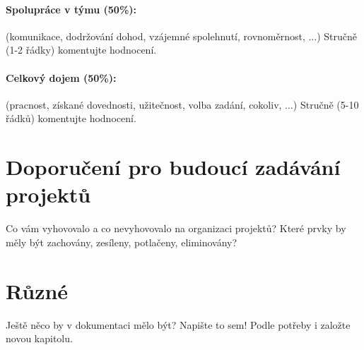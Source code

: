 \documentclass[11pt,a4paper]{article}
\begin{document}
\paragraph{Spolupráce v týmu (50\%):} (komunikace, dodržování dohod, vzájemné
spolehnutí, rovnoměrnost, $\ldots$)
Stručně (1-2 řádky) komentujte hodnocení.

\paragraph{Celkový dojem (50\%):} (pracnost, získané dovednosti, užitečnost,
volba zadání, cokoliv, $\ldots$)
Stručně (5-10 řádků) komentujte hodnocení.

\section{Doporučení pro budoucí zadávání projektů}

Co vám vyhovovalo a co nevyhovovalo na organizaci projektů? Které prvky by měly
být zachovány, zesíleny, potlačeny, eliminovány?

\section{Různé}

Ještě něco by v dokumentaci mělo být? Napište to sem! Podle potřeby i založte
novou kapitolu.
\end{document}
